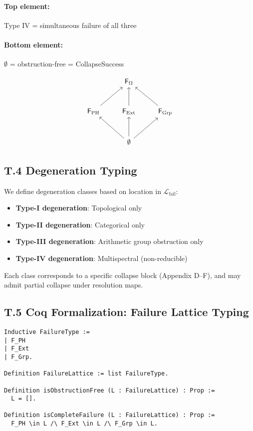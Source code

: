 \documentclass[11pt]{article}
\begin{document}
\paragraph{Top element:} Type IV = simultaneous failure of all three

\paragraph{Bottom element:} \( \emptyset \) = obstruction-free = CollapseSuccess

\[
\begin{tikzcd}[row sep=large]
& \mathsf{F}_\Omega \\
\mathsf{F}_\mathrm{PH} \arrow[ru] & \mathsf{F}_\mathrm{Ext} \arrow[u] & \mathsf{F}_\mathrm{Grp} \arrow[lu] \\
& \emptyset \arrow[lu] \arrow[u] \arrow[ru]
\end{tikzcd}
\]

\subsection*{T.4 Degeneration Typing}

We define degeneration classes based on location in \( \mathcal{L}_\mathrm{fail} \):

\begin{itemize}
  \item \textbf{Type-I degeneration}: Topological only
  \item \textbf{Type-II degeneration}: Categorical only
  \item \textbf{Type-III degeneration}: Arithmetic group obstruction only
  \item \textbf{Type-IV degeneration}: Multispectral (non-reducible)
\end{itemize}

Each class corresponds to a specific collapse block (Appendix D–F), and may admit partial collapse under resolution maps.

\subsection*{T.5 Coq Formalization: Failure Lattice Typing}

\begin{lstlisting}[language=Coq, caption=Failure Lattice Encoding, captionpos=b]
Inductive FailureType :=
| F_PH
| F_Ext
| F_Grp.

Definition FailureLattice := list FailureType.

Definition isObstructionFree (L : FailureLattice) : Prop :=
  L = [].

Definition isCompleteFailure (L : FailureLattice) : Prop :=
  F_PH \in L /\ F_Ext \in L /\ F_Grp \in L.
\end{lstlisting}
\end{document}
